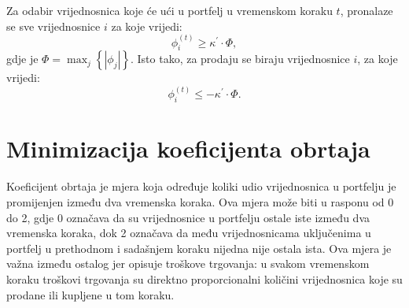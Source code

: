 \documentclass[lmodern, utf8, diplomski, numeric]{fer}
\begin{document}
  Za odabir vrijednosnica koje će ući u portfelj u vremenskom koraku $t$, pronalaze se sve vrijednosnice $i$ za koje vrijedi:
  \begin{equation*}
  \phi_i^{\left(t\right)} \ge \kappa^\prime \cdot \Phi,
  \end{equation*}
  gdje je $\Phi = \max_j \left\{ \left| \phi_j \right| \right\}$.
  Isto tako, za prodaju se biraju vrijednosnice $i$, za koje vrijedi:
  \begin{equation*}
  \phi_i^{\left(t\right)} \le -\kappa^\prime \cdot \Phi.
  \end{equation*}
  
  \section{Minimizacija koeficijenta obrtaja}
  Koeficijent obrtaja  je mjera koja određuje koliki udio vrijednosnica u portfelju je promijenjen između dva vremenska koraka.
  Ova mjera može biti u rasponu od 0 do 2, gdje 0 označava da su vrijednosnice u portfelju ostale iste između dva vremenska koraka, dok 2 označava da među vrijednosnicama uključenima u portfelj u prethodnom i sadašnjem koraku nijedna nije ostala ista.
  Ova mjera je važna između ostalog jer opisuje troškove trgovanja: u svakom vremenskom koraku troškovi trgovanja su direktno proporcionalni količini vrijednosnica koje su prodane ili kupljene u tom koraku.
  
\end{document}
